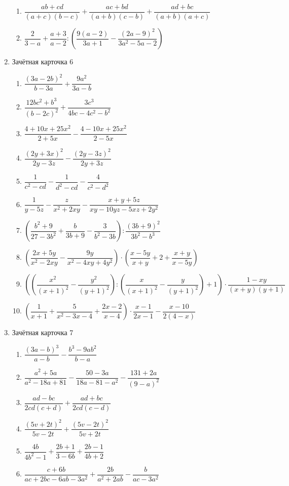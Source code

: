 \documentclass[12pt, a4paper]{article}
\begin{document}
\begin{enumerate}
\begin{enumerate}[label=\asbuk*)]
		\item \( \dfrac{ab+cd}{(a+c)(b-c)}+\dfrac{ac+bd}{(a+b)(c-b)}+\dfrac{ad+bc}{(a+b)(a+c)} \)
		\item \( \dfrac{2}{3-a}+\dfrac{a+3}{a-2}:\left( \dfrac{9(a-2)}{3a+1}-\dfrac{(2a-9)^2}{3a^2-5a-2} \right) \)
	\end{enumerate}
	\item Зачётная карточка 6
	\begin{enumerate}[label=\asbuk*)]
		\item \( \dfrac{(3a-2b)^2}{b-3a}+\dfrac{9a^2}{3a-b} \)
		\item \( \dfrac{12bc^2+b^3}{(b-2c)^2}+\dfrac{3c^3}{4bc-4c^2-b^2} \)
		\item \( \dfrac{4+10x+25x^2}{2+5x}-\dfrac{4-10x+25x^2}{2-5x} \)
		\item \( \dfrac{(2y+3x)^2}{2y-3z}-\dfrac{(2y-3z)^2}{2y+3z} \)
		\item \( \dfrac{1}{c^2-cd}-\dfrac{1}{d^2-cd}-\dfrac{4}{c^2-d^2} \)
		\item \( \dfrac{1}{y-5z}-\dfrac{z}{x^2+2xy}-\dfrac{x+y+5z}{xy-10yz-5xz+2y^2} \)
		\item \( \left( \dfrac{b^2+9}{27-3b^2}+\dfrac{b}{3b+9}-\dfrac{3}{b^2-3b} \right):\dfrac{(3b+9)^2}{3b^2-b^3} \)
		\item \( \left( \dfrac{2x+5y}{x^2-2xy}-\dfrac{9y}{x^2-4xy+4y^2} \right)\cdot\left( \dfrac{x-5y}{x+y}+2+\dfrac{x+y}{x-5y} \right) \)
		\item \( \left( \left( \dfrac{x^2}{(x+1)^2}-\dfrac{y^2}{(y+1)^2} \right) :\left(\dfrac{x}{(x+1)^2}-\dfrac{y}{(y+1)^2}  \right)+1\right)\cdot\dfrac{1-xy}{(x+y)(y+1)} \)
		\item \( \left( \dfrac{1}{x+1}+\dfrac{5}{x^2-3x-4}+\dfrac{2x-2}{x-4} \right) \cdot\dfrac{x-1}{2x-1}-\dfrac{x-10}{2(4-x)}\)
	\end{enumerate}
	\item Зачётная карточка 7
	\begin{enumerate}[label=\asbuk*)]
		\item \( \dfrac{(3a-b)^3}{a-b}-\dfrac{b^3-9ab^2}{b-a} \)
		\item \( \dfrac{a^2+5a}{a^2-18a+81}-\dfrac{50-3a}{18a-81-a^2}-\dfrac{131+2a}{(9-a)^2} \)
		\item \( \dfrac{ad-bc}{2cd(c+d)}+\dfrac{ad+bc}{2cd(c-d)} \)
		\item \( \dfrac{(5v+2t)^2}{5v-2t}+\dfrac{(5v-2t)^2}{5v+2t} \)
		\item \( \dfrac{4b}{4b^2-1}+\dfrac{2b+1}{3-6b}+\dfrac{2b-1}{4b+2} \)
		\item \( \dfrac{c+6b}{ac+2bc-6ab-3a^2}+\dfrac{2b}{a^2+2ab}-\dfrac{b}{ac-3a^2} \)

\end{enumerate}
\end{enumerate}
\end{document}
